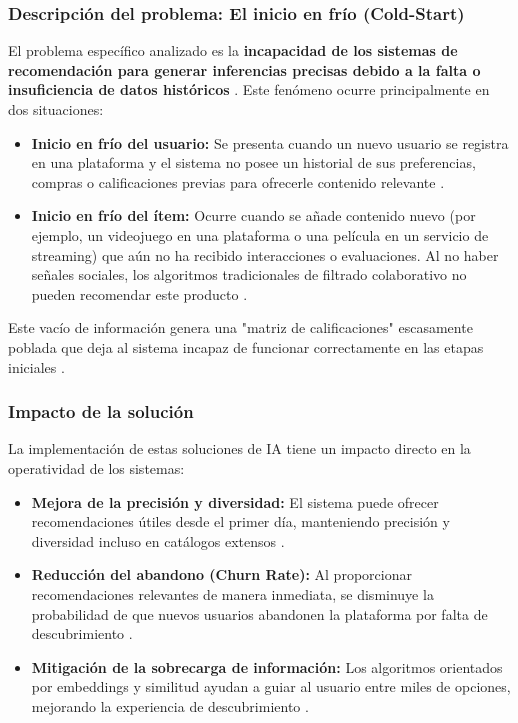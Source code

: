 \documentclass[12pt]{article}
\begin{document}
\subsubsection{Descripción del problema: El inicio en frío (Cold-Start)}
El problema específico analizado es la \textbf{incapacidad de los sistemas de recomendación para generar inferencias precisas debido a la falta o insuficiencia de datos históricos} \cite{freecodecamp-cold-start-problem}. Este fenómeno ocurre principalmente en dos situaciones:
\begin{itemize}
	\item \textbf{Inicio en frío del usuario:} Se presenta cuando un nuevo usuario se registra en una plataforma y el sistema no posee un historial de sus preferencias, compras o calificaciones previas para ofrecerle contenido relevante \cite{freecodecamp-cold-start-problem, Wang_Xu_Li_Li_2025}.
	\item \textbf{Inicio en frío del ítem:} Ocurre cuando se añade contenido nuevo (por ejemplo, un videojuego en una plataforma o una película en un servicio de streaming) que aún no ha recibido interacciones o evaluaciones. Al no haber señales sociales, los algoritmos tradicionales de filtrado colaborativo no pueden recomendar este producto \cite{DBLP:journals/corr/abs-2005-08148, freecodecamp-cold-start-problem}.
\end{itemize}

Este vacío de información genera una "matriz de calificaciones" escasamente poblada que deja al sistema incapaz de funcionar correctamente en las etapas iniciales \cite{DBLP:journals/corr/abs-2005-08148, freecodecamp-cold-start-problem}.

\subsubsection{Impacto de la solución}
La implementación de estas soluciones de IA tiene un impacto directo en la operatividad de los sistemas:
\begin{itemize}
	\item \textbf{Mejora de la precisión y diversidad:} El sistema puede ofrecer recomendaciones útiles desde el primer día, manteniendo precisión y diversidad incluso en catálogos extensos \cite{DBLP:journals/corr/abs-2005-08148, Wang_Xu_Li_Li_2025}.
	\item \textbf{Reducción del abandono (Churn Rate):} Al proporcionar recomendaciones relevantes de manera inmediata, se disminuye la probabilidad de que nuevos usuarios abandonen la plataforma por falta de descubrimiento \cite{freecodecamp-cold-start-problem}.
	\item \textbf{Mitigación de la sobrecarga de información:} Los algoritmos orientados por embeddings y similitud ayudan a guiar al usuario entre miles de opciones, mejorando la experiencia de descubrimiento \cite{DBLP:journals/corr/abs-2005-08148, Wang_Xu_Li_Li_2025}.
\end{itemize}
\end{document}
